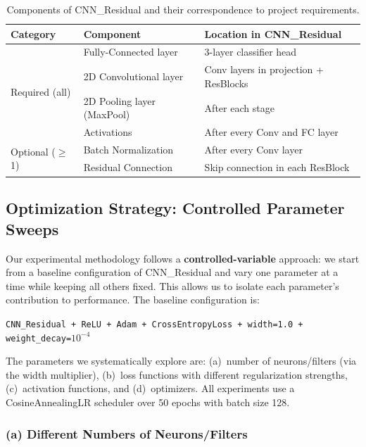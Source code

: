\documentclass[11pt,a4paper]{article}
\begin{document}
\begin{table}[H]
\centering
\caption{Components of CNN\_Residual and their correspondence to project requirements.}
\label{tab:components}
\begin{tabular}{@{}lll@{}}
\toprule
\textbf{Category} & \textbf{Component} & \textbf{Location in CNN\_Residual} \\
\midrule
\multirow{4}{*}{Required (all)}
    & Fully-Connected layer      & 3-layer classifier head \\
    & 2D Convolutional layer     & Conv layers in projection + ResBlocks \\
    & 2D Pooling layer (MaxPool) & After each stage \\
    & Activations                & After every Conv and FC layer \\
\midrule
\multirow{2}{*}{Optional ($\ge$1)}
    & Batch Normalization        & After every Conv layer \\
    & Residual Connection        & Skip connection in each ResBlock \\
\bottomrule
\end{tabular}
\end{table}

\subsection{Optimization Strategy: Controlled Parameter Sweeps}

Our experimental methodology follows a \textbf{controlled-variable} approach: we start from a baseline configuration of CNN\_Residual and vary one parameter at a time while keeping all others fixed. This allows us to isolate each parameter's contribution to performance. The baseline configuration is:

\begin{center}
\texttt{CNN\_Residual + ReLU + Adam + CrossEntropyLoss + width=1.0 + weight\_decay=$10^{-4}$}
\end{center}

The parameters we systematically explore are: (a)~number of neurons/filters (via the width multiplier), (b)~loss functions with different regularization strengths, (c)~activation functions, and (d)~optimizers. All experiments use a CosineAnnealingLR scheduler over 50 epochs with batch size 128.

\subsubsection{(a) Different Numbers of Neurons/Filters}
\end{document}
